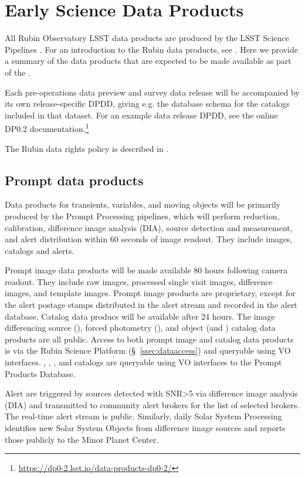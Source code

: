 \section{Early Science Data Products}
\label{sec:data}

All Rubin Observatory LSST data products are produced by the LSST Science Pipelines \cite{2019ASPC..523..521B,2018PASJ...70S...5B}. 
For an introduction to the Rubin data products, see \citet{RubinDataProductsAbridged}.
Here we provide a summary of the data products that are expected to be made available as part of the \esp.

Each pre-operations data preview and survey data release will be accompanied by its own release-specific DPDD, giving e.g. the  database schema for the catalogs included in that dataset.
For an example data release DPDD, see the online DP0.2 documentation.\footnote{\url{https://dp0-2.lsst.io/data-products-dp0-2/}}

The Rubin data rights policy is described in  \cite{RDO-013}.

\subsection{Prompt data products}

Data products for transients, variables, and moving objects will be primarily produced by the Prompt Processing pipelines, which will perform reduction, calibration, difference image analysis (DIA), source detection and measurement, and alert distribution within 60 seconds of image readout. 
They include images, catalogs and alerts. 

Prompt image data products will be made available 80 hours following camera readout. 
They include raw images, processed single visit images, difference images, and template images. 
Prompt image products are proprietary, except for the alert postage stamps distributed in the alert stream and recorded in the alert database.
Catalog data producs will be available after 24 hours. 
The image differencing source (\DIASource), forced photometry (\DIAForcedSource), and object (\DIAObject and \SSObject)
catalog data products are all public. 
Access to both prompt image and catalog data products is via the Rubin Science Platform (\S~\ref{ssec:dataaccess}) and queryable using VO interfaces. 
\DIASource, \DIAForcedSource, \DIAObject, and \SSObject catalogs are queryable using VO interfaces to the Prompt Products Database.

Alert are triggered by sources detected with SNR>5 via difference image analysis (DIA) and transmitted to community alert brokers for the list of selected brokers.
The real-time alert stream is public. 
Similarly, daily Solar System Processing identifies new Solar System Objects from difference image sources and reports those publicly to the Minor Planet Center.

